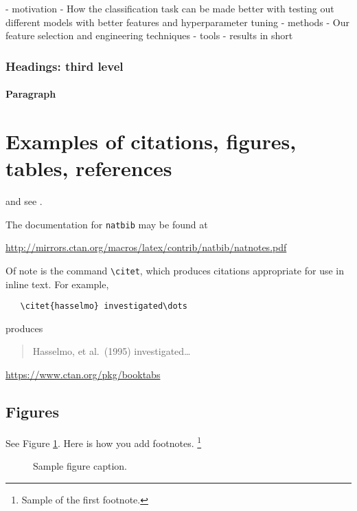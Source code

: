\documentclass{article}
\begin{document}
- motivation - How the classification task can be made better with testing out different models with better features and hyperparameter tuning
- methods - Our feature selection and engineering techniques
- tools
- results in short


\subsubsection{Headings: third level}
\lipsum[6]

\paragraph{Paragraph}
\lipsum[7]

\section{Examples of citations, figures, tables, references}
\label{sec:others}
\lipsum[8] \cite{kour2014real,kour2014fast} and see \cite{hadash2018estimate}.

The documentation for \verb+natbib+ may be found at
\begin{center}
  \url{http://mirrors.ctan.org/macros/latex/contrib/natbib/natnotes.pdf}
\end{center}
Of note is the command \verb+\citet+, which produces citations
appropriate for use in inline text.  For example,
\begin{verbatim}
   \citet{hasselmo} investigated\dots
\end{verbatim}
produces
\begin{quote}
  Hasselmo, et al.\ (1995) investigated\dots
\end{quote}

\begin{center}
  \url{https://www.ctan.org/pkg/booktabs}
\end{center}


\subsection{Figures}
\lipsum[10] 
See Figure \ref{fig:fig1}. Here is how you add footnotes. \footnote{Sample of the first footnote.}
\lipsum[11] 

\begin{figure}
  \centering
  \fbox{\rule[-.5cm]{4cm}{4cm} \rule[-.5cm]{4cm}{0cm}}
  \caption{Sample figure caption.}
  \label{fig:fig1}
\end{figure}
\end{document}
